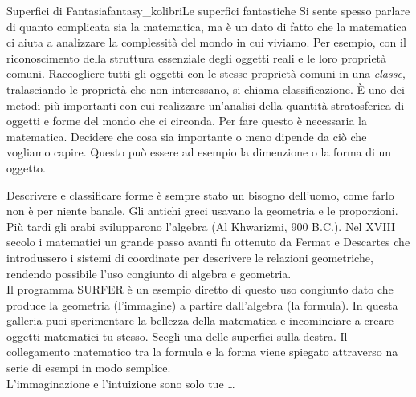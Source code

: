 \begin{surferIntroPage}{Superfici di Fantasia}{fantasy_kolibri}{Le superfici fantastiche}
Si sente spesso parlare di quanto complicata sia la matematica, ma \`e un dato di fatto che la matematica ci aiuta a analizzare la complessit\`a del mondo in cui viviamo. Per esempio, con il riconoscimento della struttura essenziale degli oggetti reali e le loro propriet\`a comuni. Raccogliere tutti gli oggetti con le stesse propriet\`a comuni in una \textit{classe}, tralasciando le propriet\`a che non interessano, si chiama classificazione. \`E uno dei metodi pi\`u importanti con cui realizzare un'analisi della quantit\`a stratosferica di oggetti e forme del mondo che ci circonda. Per fare questo \`e necessaria la matematica. Decidere che cosa sia importante o meno dipende da ci\`o che vogliamo capire. Questo pu\`o essere ad esempio la dimenzione o la forma di un oggetto.
\\

\vspace{0.4cm}

Descrivere e classificare forme \`e sempre stato un bisogno dell'uomo, come farlo non \`e per niente banale. Gli antichi greci usavano la geometria e le proporzioni. Pi\`u tardi gli arabi svilupparono l'algebra (Al Khwarizmi, 900 B.C.). Nel XVIII secolo i matematici un grande passo avanti fu ottenuto da Fermat e Descartes che introdussero i sistemi di coordinate per descrivere le relazioni geometriche, rendendo possibile l'uso congiunto di algebra e geometria.
\\
\vspace{0.4cm}
Il programma SURFER \`e un esempio diretto di questo uso congiunto dato che produce la geometria (l'immagine) a partire dall'algebra (la formula).
In questa galleria puoi sperimentare la bellezza della matematica e incominciare a creare oggetti matematici tu stesso. Scegli una delle superfici sulla destra. Il collegamento matematico tra la formula e la forma viene spiegato attraverso na serie di esempi in modo semplice.\\
L'immaginazione e l'intuizione sono solo tue \dots
\end{surferIntroPage}
